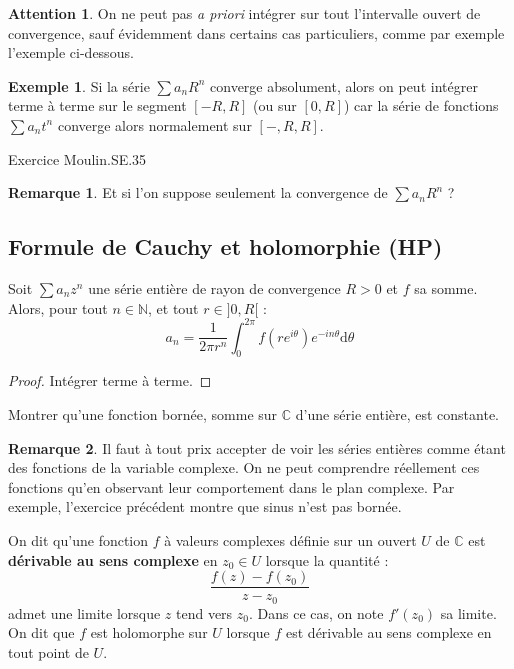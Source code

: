 \documentclass[french]{article}
\newcommand{\N}{\mathbb{N}}
\newcommand{\C}{\mathbb{C}}
\renewcommand{\d}{\text{d}}
\theoremstyle{plain}
\theoremstyle{definition}
\newtheorem*{ex}{Exemple}
\newtheorem*{rmq}{Remarque}
\newtheorem*{attention}{Attention}
\theoremstyle{remark}
\begin{document}
\begin{attention}
	On ne peut pas \textit{a priori} intégrer sur tout l'intervalle ouvert de convergence, sauf évidemment dans certains cas particuliers, comme par exemple l'exemple ci-dessous.
\end{attention}

\begin{ex}
	Si la série $\displaystyle\sum a_nR^n$ converge absolument, alors on peut intégrer terme à terme sur le segment $[-R,R]$ (ou sur $[0,R]$) car la série de fonctions $\displaystyle\sum a_nt^n$ converge alors normalement sur $[-,R,R]$.
\end{ex}

Exercice Moulin.SE.35

\begin{rmq}
	Et si l'on suppose seulement la convergence de $\displaystyle\sum a_nR^n$ ?
\end{rmq}

\subsection{Formule de Cauchy et holomorphie (HP)}

\begin{prop}%
	Soit $\displaystyle\sum a_nz^n$ une série entière de rayon de convergence $R>0$ et $f$ sa somme. Alors, pour tout $n\in\N$, et tout $r\in]0,R[$ : $$a_n=\frac{1}{2\pi r^n}\int_{0}^{2\pi}f(re^{i\theta})e^{-in\theta}\d\theta$$
\end{prop}
\begin{proof}
	Intégrer terme à terme.
\end{proof}

\begin{exo}
	Montrer qu'une fonction bornée, somme sur $\C$ d'une série entière, est constante.
\end{exo}

\begin{rmq}
	Il faut à tout prix accepter de voir les séries entières comme étant des fonctions de la variable complexe. On ne peut comprendre réellement ces fonctions qu'en observant leur comportement dans le plan complexe. Par exemple, l'exercice précédent montre que sinus n'est pas bornée.
\end{rmq}

\begin{dfn}
	On dit qu'une fonction $f$ à valeurs complexes définie sur un ouvert $U$ de $\C$ est \textbf{dérivable au sens complexe} en $z_0\in U$ lorsque la quantité : $$\frac{f(z)-f(z_0)}{z-z_0}$$ admet une limite lorsque $z$ tend vers $z_0$. Dans ce cas, on note $f'(z_0)$ sa limite. \\
	On dit que $f$ est holomorphe sur $U$ lorsque $f$ est dérivable au sens complexe en tout point de $U$.
\end{dfn}
\end{document}
